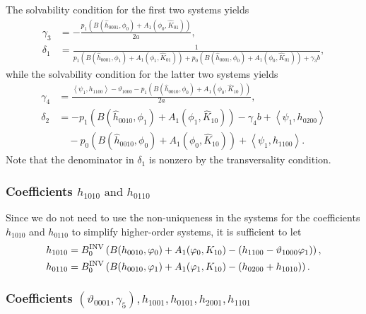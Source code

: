 The solvability condition for the first two systems yields
\begin{equation*}
\begin{aligned}
\gamma_3 &= -\frac{p_1 \left( 
				B(\hat h_{0001},\phi_0) + A_1(\phi_0,\hat K_{01}) \right)}{2a}, \\
\delta_1 &= \frac{1}{p_1 \left(
			B(\hat h_{0001},\phi_1) + A_1(\phi_1,\hat K_{01}) \right) + p_0
      \left( B(\hat h_{0001},\phi_0) + A_1(\phi_0,\hat K_{01}) \right) + \gamma_3 b},
\end{aligned}
\end{equation*}
while the solvability condition for the latter two systems yields
\begin{equation*}
\begin{aligned}
    \gamma_4 &= \frac{\left< \psi_1, h_{1100}  \right> - \vartheta_{1000} - p_1 \left( B(\hat
				h_{0010},\phi_0) + A_1(\phi_0,\hat K_{10})\right)}{2a} ,\\
\delta_2 &= -p_1 \left( B(\hat h_{0010},\phi_1) + A_1(\phi_1,\hat K_{10}) \right)
    - \gamma_4 b + \left< \psi_1, h_{0200} \right> \\
	& \quad - p_0 \left( B(\hat h_{0010},\phi_0) + A_1(\phi_0,\hat K_{10}) \right) + \left< \psi_1, h_{1100} \right>.
\end{aligned}
\end{equation*}
Note that the denominator in $\delta_1$ is nonzero by the transversality
condition.

\subsubsection{Coefficients \texorpdfstring{$h_{1010} \text{ and } h_{0110}$}{h1010 and h0110}}

Since we do not need to use the non-uniqueness in the systems for the
coefficients $h_{1010}$ and $h_{0110}$ to simplify higher-order systems,
it is sufficient to let
\begin{equation*}
\begin{aligned}
    h_{1010} &= B^{\mathrm{INV}}_{0} \left(B(h_{0010},\varphi_0) + A_1(\varphi_0,K_{10})-(h_{1100} - \vartheta_{1000}\varphi_1)\right), \\
    h_{0110} &= B^{\mathrm{INV}}_{0} \left(B(h_{0010},\varphi_1) + A_1(\varphi_1,K_{10})-(h_{0200} + h_{1010})\right).
\end{aligned}
\end{equation*}

\subsubsection{Coefficients \texorpdfstring{$(\vartheta_{0001},\gamma_5),h_{1001},
h_{0101}, h_{2001}, h_{1101}$}{(theta0001,gamma5),h1001,h0101,h2001,h1101}}

